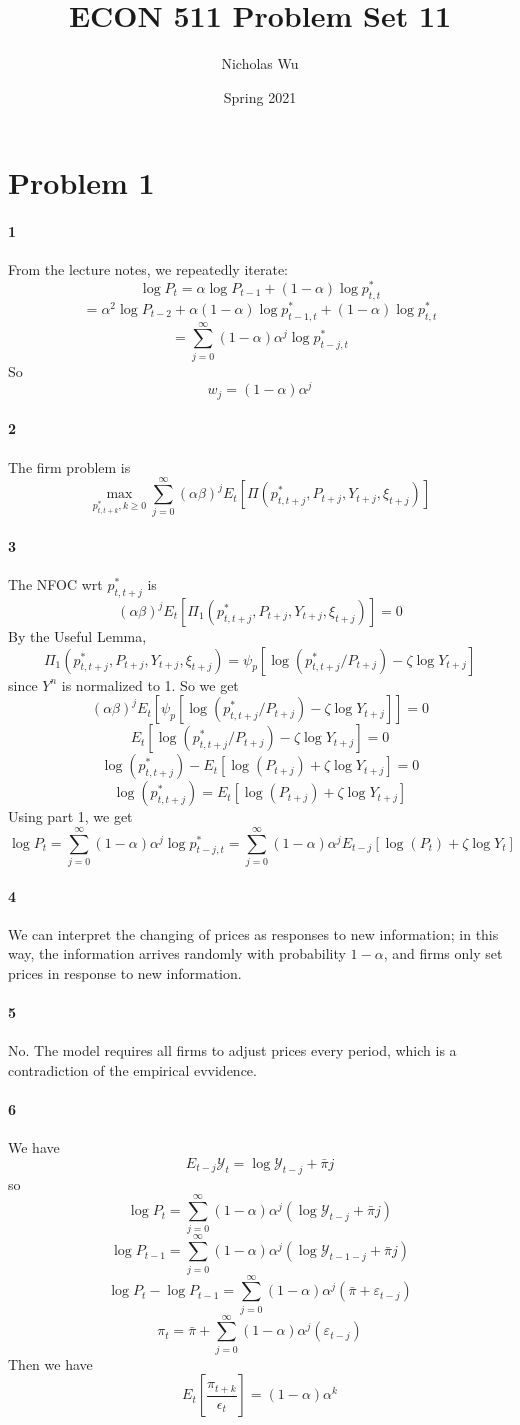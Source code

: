 \documentclass[10pt,letter]{article}
\newcommand{\problem}[1]{\section*{Problem #1}}
\newcommand{\problempart}[1]{\paragraph{#1}}
\begin{document}


\title{ECON 511 Problem Set 11}

\author{Nicholas Wu}

\date{Spring 2021}

\maketitle

\problem{1}

\problempart{1}
From the lecture notes, we repeatedly iterate:
\[ \log P_t = \alpha \log P_{t-1} + (1-\alpha) \log p^*_{t,t} \]
\[ = \alpha^2 \log P_{t-2} + \alpha(1-\alpha)\log p^*_{t-1,t} + (1-\alpha) \log p^*_{t,t} \]
\[ = \sum_{j=0}^\infty (1-\alpha)\alpha^j \log p^*_{t-j,t} \]
So
\[ w_j = (1-\alpha)\alpha^j \]
\problempart{2}
The firm problem is
\[ \max_{p^*_{t,t+k}, k\ge 0 } \sum_{j = 0}^\infty (\alpha\beta)^j E_t[\Pi(p^*_{t,t+j}, P_{t+j},Y_{t+j}, \xi_{t+j})] \]
\problempart{3}
The NFOC wrt $p^*_{t, t+j}$ is
\[ (\alpha\beta)^j E_t[\Pi_1(p^*_{t,t+j}, P_{t+j},Y_{t+j}, \xi_{t+j})] = 0 \]
By the Useful Lemma,
\[ \Pi_1(p^*_{t,t+j}, P_{t+j},Y_{t+j}, \xi_{t+j}) = \psi_p[\log(p^*_{t,t+j}/P_{t+j})- \zeta \log Y_{t+j}]\]
since $Y^n$ is normalized to 1. So we get
\[ (\alpha\beta)^j E_t[\psi_p[\log(p^*_{t,t+j}/P_{t+j})- \zeta \log Y_{t+j}]] = 0 \]
\[ E_t[\log(p^*_{t,t+j}/P_{t+j})- \zeta \log Y_{t+j}] = 0 \]
\[  \log(p^*_{t,t+j}) - E_t[\log (P_{t+j}) + \zeta \log Y_{t+j}] = 0 \]
\[  \log(p^*_{t,t+j}) = E_t[\log (P_{t+j}) + \zeta \log Y_{t+j}]  \]
Using part 1, we get
\[ \log P_t = \sum_{j=0}^\infty (1-\alpha)\alpha^j \log p^*_{t-j,t} =\sum_{j=0}^\infty (1-\alpha)\alpha^j E_{t-j}[\log (P_t) + \zeta \log Y_t]  \]



\problempart{4}
We can interpret the changing of prices as responses to new information; in this way, the information arrives randomly with probability $1-\alpha$, and firms only set prices in response to new information.
\problempart{5}
No. The model requires all firms to adjust prices every period, which is a contradiction of the empirical evvidence.
\problempart{6}
We have
\[ E_{t-j}\mathcal{Y}_t = \log \mathcal{Y}_{t-j} + \bar{\pi}j \]
so
\[ \log P_t = \sum_{j=0}^\infty (1-\alpha)\alpha^j (\log \mathcal{Y}_{t-j} + \bar{\pi}j)  \]
\[ \log P_{t-1} = \sum_{j=0}^\infty (1-\alpha)\alpha^j (\log \mathcal{Y}_{t-1-j} + \bar{\pi}j)  \]
\[ \log P_t  - \log P_{t-1} = \sum_{j=0}^\infty (1-\alpha)\alpha^j (\bar\pi + \varepsilon_{t-j})  \]
\[ \pi_t  = \bar\pi +  \sum_{j=0}^\infty (1-\alpha) \alpha^j ( \varepsilon_{t-j})  \]
Then we have
\[ E_t\left[\frac{\pi_{t+k}}{\epsilon_t}\right] = (1-\alpha)\alpha^k \]
\end{document}
